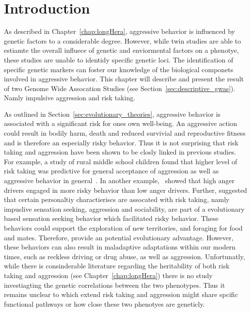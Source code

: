 \section{Introduction}
\label{sec:introduction}

As described in Chapter~\ref{chap:longHera}, aggressive behavior is influenced by genetic factors to a considerable degree.
However, while twin studies are able to estiamte the overall influece of genetic and enviormental factors on a phenotye, these studies are unable to identidy specific genetic loci.
The identification of specific genetic markers can foster our knowledge of the biological componets involved in aggressive behavior. 
This chapter will describe and present the result of two Genome Wide Assocation Studies (see Section~\ref{sec:descriptive_gwas}).
Namly impulsive aggression and risk taking.

As outlined in Section~\ref{sec:evolutionary_theories}, aggressive behavior is associated with a significant risk for ones own well-being.
An aggressive action could result in bodily harm, death and reduced survivial and reproductive fitness and is therefore an especially risky behavior.
Thus it is not surprising that risk taking and aggression have been shown to be closly linked in previous studies.
For example, a study of rural middle school children found that higher level of risk taking was  predictive for general acceptance of aggression as well as aggressive behavior in general~\cite{Swaim2004}.
In another example,~\citet{Deffenbacher2003} showed that high anger drivers engaged in more risky behavior than low anger drivers.
Further, \citet{Zuckerman2000} suggested that certain personaltiy charactieriscs are assocated with risk taking, namly impuslive sensation seeking, aggression and sociability, are part of a evolutionary based sensation seeking behavior which facilitated risky behavior.
These behaviors could support the exploration of new territories, and foraging for food and mates.
Therefore, provide an potential evolutionary advantage.
However, these behaviors can also result in maladaptive adaptations within our modern times, such as reckless driving or drug abuse, as well as aggression.
Unfortunatly, while there is consinderable literature regarding the heritability of both risk taking and aggression (see Chapter~\ref{chap:longHera}) there is no study investiagting the genetic correlations between the two phenotypes.
Thus it remains unclear to which extend risk taking and aggression might share spcific functional pathways or how close these two phenotyes are geneticly.

